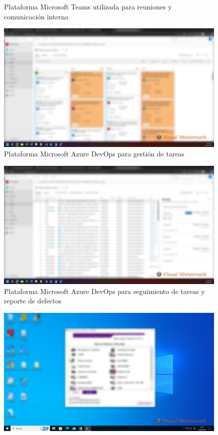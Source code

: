 \documentclass[12pt,a4paper]{report}
\begin{document}
\begin{itemize}
\begin{figure}[H]
      \caption{Plataforma Microsoft Teams utilizada para reuniones y comunicación interna}
    \end{figure}
    \begin{figure}[H]
      \centering
      \includegraphics[width=14cm]{images/pantallas/azure-board.png}
      \caption{Plataforma Microsoft Azure DevOps para gestión de tareas}
    \end{figure}
    \begin{figure}[H]
      \centering
      \includegraphics[width=14cm]{images/pantallas/azure-backlogs.png}
      \caption{Plataforma Microsoft Azure DevOps para seguimiento de tareas y reporte de defectos}
    \end{figure}
    \begin{figure}[H]
      \centering
      \includegraphics[width=14cm]{images/pantallas/centralizacion-de-sistemas.png}

\end{figure}
\end{itemize}
\end{document}
